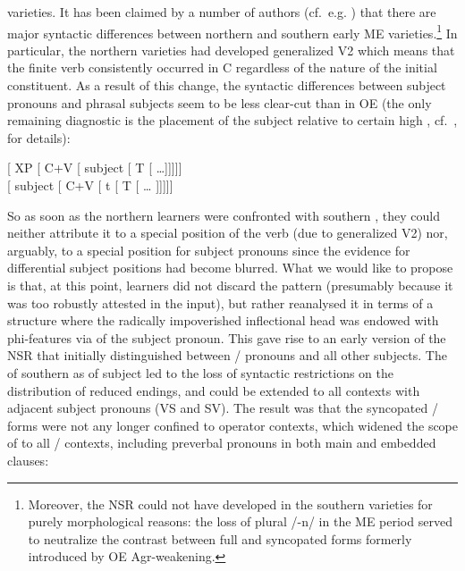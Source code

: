 \documentclass[output=paper]{langsci/langscibook}
\begin{document}
varieties. It has been claimed by a number of authors (cf.\ e.g.
\citealt{Krochtaylor:1997,Trips:2002}) that there are major syntactic
differences between northern and southern early ME
varieties.\footnote{Moreover, the \gls{NSR} could not
    have developed in the southern varieties for purely morphological reasons:
    the loss of plural /-n/ in the \gls{ME} period served to
    neutralize the contrast between full and syncopated forms formerly
    introduced by \gls{OE} Agr-weakening.} In particular, the northern
    varieties had developed generalized V2 which means that the finite verb
    consistently occurred in C regardless of the nature of the initial
    constituent.  As a result of this change, the syntactic differences between
    subject pronouns and phrasal subjects seem to be less clear-cut than in
    \gls{OE} (the only remaining diagnostic is the placement of the subject
    relative to certain high , cf.\ \citealt{deHaas:2011},
    \citealt{deHaasandvanKemenade:2015} for details):

\ea
\ea \mbox[ XP [ C+V [ subject [ T [ \ldots{}]]]]]\\
\ex \mbox[ subject [ C+V [ t [ T [ \ldots{} ]]]]]
\z
\z

So as soon as the northern learners were confronted with southern
, they could neither attribute it to a special position
of the verb (due to generalized V2) nor, arguably, to a special position for
subject pronouns since the evidence for differential subject positions had
become blurred. What we would like to propose is that, at this point, learners
did not discard the pattern (presumably because it was too robustly attested in
the input), but rather reanalysed it in terms of a structure where the
radically impoverished inflectional head was endowed with
phi-features via  of the subject pronoun.
This gave rise to an early version of the \gls{NSR} that initially
distinguished between \Fpl/\Spl{} pronouns and all other subjects. The
 of southern  as 
of subject  led to the loss of syntactic restrictions on the
distribution of reduced endings, and  could be
extended to all contexts with adjacent subject pronouns (VS and SV). The result
was that the syncopated \Fpl/\Spl{} forms were not any longer confined to
operator contexts, which widened the scope of  to all
\Fpl/\Spl{} contexts, including preverbal pronouns in both main and embedded
clauses:
\end{document}
